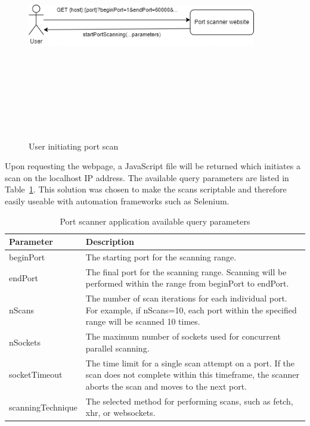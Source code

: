 \begin{figure}[ht]
    \centering
\includegraphics[width=10cm, height=10cm, keepaspectratio]{port_scanning_techniques/img/initiate_port_scan.png}
    \caption{User initiating port scan}
    \label{fig:initiate-scan}
\end{figure}

Upon requesting the webpage, a JavaScript file will be returned which initiates a scan on the localhost IP address. The available query parameters are listed in Table~\ref{tab:port-scan-params}. This solution was chosen to make the scans scriptable and therefore easily useable with automation frameworks such as Selenium.

\begin{table}[htbp]
\footnotesize
\centering
\begin{tabular}{p{3cm} p{10cm}}
    \toprule
    Parameter & Description \\
    \midrule
    beginPort & The starting port for the scanning range. \\
    endPort & The final port for the scanning range. Scanning will be performed within the range from beginPort to endPort. \\
    nScans & The number of scan iterations for each individual port. For example, if nScans=10, each port within the specified range will be scanned 10 times. \\
    nSockets & The maximum number of sockets used for concurrent parallel scanning. \\
    socketTimeout & The time limit for a single scan attempt on a port. If the scan does not complete within this timeframe, the scanner aborts the scan and moves to the next port. \\
    scanningTechnique & The selected method for performing scans, such as fetch, xhr, or websockets. \\
    \bottomrule
\end{tabular}
\caption{Port scanner application available query parameters}
\label{tab:port-scan-params}
\end{table}

